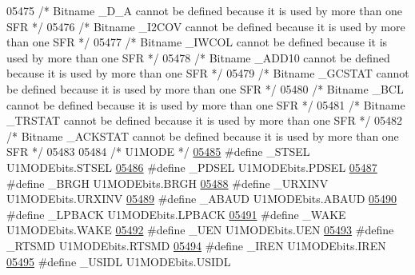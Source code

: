 \begin{DoxyCode}
05475 \textcolor{comment}{/* Bitname \_D\_A cannot be defined because it is used by more than one SFR */}
05476 \textcolor{comment}{/* Bitname \_I2COV cannot be defined because it is used by more than one SFR */}
05477 \textcolor{comment}{/* Bitname \_IWCOL cannot be defined because it is used by more than one SFR */}
05478 \textcolor{comment}{/* Bitname \_ADD10 cannot be defined because it is used by more than one SFR */}
05479 \textcolor{comment}{/* Bitname \_GCSTAT cannot be defined because it is used by more than one SFR */}
05480 \textcolor{comment}{/* Bitname \_BCL cannot be defined because it is used by more than one SFR */}
05481 \textcolor{comment}{/* Bitname \_TRSTAT cannot be defined because it is used by more than one SFR */}
05482 \textcolor{comment}{/* Bitname \_ACKSTAT cannot be defined because it is used by more than one SFR */}
05483 
05484 \textcolor{comment}{/* U1MODE */}
\hypertarget{a00009_source_l05485}{}\hyperlink{a00009_a9ac9ffcee603a43f9c730a156f7dbd60}{05485} \textcolor{preprocessor}{#define \_STSEL U1MODEbits.STSEL}
\hypertarget{a00009_source_l05486}{}\hyperlink{a00009_a50dcac1f83b325633625bc1afea81816}{05486} \textcolor{preprocessor}{#define \_PDSEL U1MODEbits.PDSEL}
\hypertarget{a00009_source_l05487}{}\hyperlink{a00009_aa83e7a45d9ffd4a51e37335b95d2ff24}{05487} \textcolor{preprocessor}{#define \_BRGH U1MODEbits.BRGH}
\hypertarget{a00009_source_l05488}{}\hyperlink{a00009_afaa661169d7fc80b6066b0470c105b58}{05488} \textcolor{preprocessor}{#define \_URXINV U1MODEbits.URXINV}
\hypertarget{a00009_source_l05489}{}\hyperlink{a00009_a097268313d8548f9d2843934f22e25fb}{05489} \textcolor{preprocessor}{#define \_ABAUD U1MODEbits.ABAUD}
\hypertarget{a00009_source_l05490}{}\hyperlink{a00009_a03fc8d04d03b261daa85dae274c19505}{05490} \textcolor{preprocessor}{#define \_LPBACK U1MODEbits.LPBACK}
\hypertarget{a00009_source_l05491}{}\hyperlink{a00009_a4b11d8f94ae8758b70734b145d917332}{05491} \textcolor{preprocessor}{#define \_WAKE U1MODEbits.WAKE}
\hypertarget{a00009_source_l05492}{}\hyperlink{a00009_ac7e1cfc0112c9ae053d92aba70190891}{05492} \textcolor{preprocessor}{#define \_UEN U1MODEbits.UEN}
\hypertarget{a00009_source_l05493}{}\hyperlink{a00009_aeabea4f8e9c9e6fed641b9a67a288ef9}{05493} \textcolor{preprocessor}{#define \_RTSMD U1MODEbits.RTSMD}
\hypertarget{a00009_source_l05494}{}\hyperlink{a00009_afa84616f7d2f6c37bea7273d5eb2347d}{05494} \textcolor{preprocessor}{#define \_IREN U1MODEbits.IREN}
\hypertarget{a00009_source_l05495}{}\hyperlink{a00009_a4b01ec21331629d7ac0330e2b4f305cc}{05495} \textcolor{preprocessor}{#define \_USIDL U1MODEbits.USIDL}

\end{DoxyCode}
